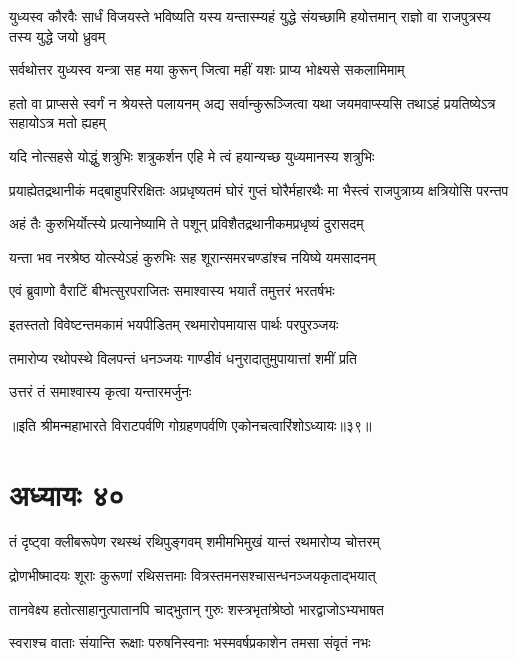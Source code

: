\threelineshloka
{युध्यस्व कौरवैः सार्धं विजयस्ते भविष्यति}
{यस्य यन्तास्म्यहं युद्धे संयच्छामि हयोत्तमान्}
{राज्ञो वा राजपुत्रस्य तस्य युद्धे जयो ध्रुवम्}


\twolineshloka
{सर्वथोत्तर युध्यस्व यन्त्रा सह मया कुरून्}
{जित्वा महीं यशः प्राप्य भोक्ष्यसे सकलामिमाम्}


\onelineshloka
{हतो वा प्राप्ससे स्वर्गं न श्रेयस्ते पलायनम्}
\twolineshloka
{अद्य सर्वान्कुरूञ्जित्वा यथा जयमवाप्स्यसि}
{तथाऽहं प्रयतिष्येऽत्र सहायोऽत्र मतो ह्यहम्}


\twolineshloka
{यदि नोत्सहसे योद्धुं शत्रुभिः शत्रुकर्शन}
{एहि मे त्वं हयान्यच्छ युध्यमानस्य शत्रुभिः}


\threelineshloka
{प्रयाह्येतद्रथानीकं मद्बाहुपरिरक्षितः}
{अप्रधृष्यतमं घोरं गुप्तं घोरैर्महारथैः}
{मा भैस्त्वं राजपुत्राग्र्य क्षत्रियोसि परन्तप}


\twolineshloka
{अहं तैः कुरुभिर्योत्स्ये प्रत्यानेष्यामि ते पशून्}
{प्रविशैतद्रथानीकमप्रधृष्यं दुरासदम्}


\twolineshloka
{यन्ता भव नरश्रेष्ठ योत्स्येऽहं कुरुभिः सह}
{शूरान्समरचण्डांश्च नयिष्ये यमसादनम्}



\twolineshloka
{एवं ब्रुवाणो वैराटिं बीभत्सुरपराजितः}
{समाश्वास्य भयार्तं तमुत्तरं भरतर्षभः}


\twolineshloka
{इतस्ततो विवेष्टन्तमकामं भयपीडितम्}
{रथमारोपमायास पार्थः परपुरञ्जयः}


\twolineshloka
{तमारोप्य रथोपस्थे विलपन्तं धनञ्जयः}
{गाण्डीवं धनुरादातुमुपायात्तां शमीं प्रति}



\onelineshloka
{उत्तरं तं समाश्वास्य कृत्वा यन्तारमर्जुनः}


॥इति श्रीमन्महाभारते विराटपर्वणि गोग्रहणपर्वणि एकोनचत्वारिंशोऽध्यायः॥३९॥

\chapter{अध्यायः ४०}

\twolineshloka
{तं दृष्ट्वा क्लीबरूपेण रथस्थं रथिपुङ्गवम्}
{शमीमभिमुखं यान्तं रथमारोप्य चोत्तरम्}


\twolineshloka
{द्रोणभीष्मादयः शूराः कुरूणां रथिसत्तमाः}
{वित्रस्तमनसश्चासन्धनञ्जयकृताद्भयात्}


\twolineshloka
{तानवेक्ष्य हतोत्साहानुत्पातानपि चाद्भुतान्}
{गुरुः शस्त्रभृतांश्रेष्ठो भारद्वाजोऽभ्यभाषत}


\twolineshloka
{स्वराश्च वाताः संयान्ति रूक्षाः परुषनिस्वनाः}
{भस्मवर्षप्रकाशेन तमसा संवृतं नभः}


